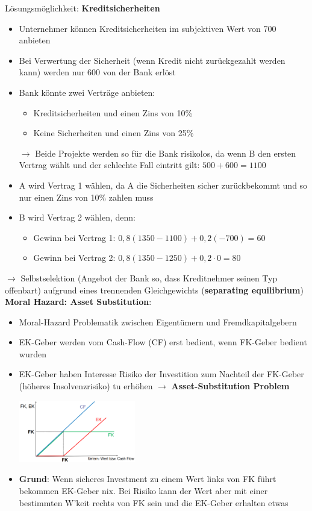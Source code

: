 Lösungsmöglichkeit: \textbf{Kreditsicherheiten}
\begin{itemize}
	\item Unternehmer können Kreditsicherheiten im subjektiven Wert von 700 anbieten
	\item Bei Verwertung der Sicherheit (wenn Kredit nicht zurückgezahlt werden kann) werden nur 600 von der Bank erlöst
	\item Bank könnte zwei Verträge anbieten:
	\begin{itemize}
		\item Kreditsicherheiten und einen Zins von 10\%
		\item Keine Sicherheiten und einen Zins von 25\%
	\end{itemize}
	$\rightarrow$ Beide Projekte werden so für die Bank risikolos, da wenn B den ersten Vertrag wählt und der schlechte Fall eintritt gilt: $500+600=1100$
	\item A wird Vertrag 1 wählen, da A die Sicherheiten sicher zurückbekommt und so nur einen Zins von 10\% zahlen muss
	\item B wird Vertrag 2 wählen, denn:
	\begin{itemize}
		\item Gewinn bei Vertrag 1: $0,8(1350-1100)+0,2(-700)=60$
		\item Gewinn bei Vertrag 2: $0,8(1350-1250)+0,2\cdot 0=80$
	\end{itemize}
\end{itemize}

$\rightarrow$ Selbstselektion (Angebot der Bank so, dass Kreditnehmer seinen Typ offenbart) aufgrund eines trennenden Gleichgewichts (\textbf{separating equilibrium})\\

\textbf{Moral Hazard: Asset Substitution}:
\begin{itemize}
	\item Moral-Hazard Problematik zwischen Eigentümern und Fremdkapitalgebern
	\item EK-Geber werden vom Cash-Flow (CF) erst bedient, wenn FK-Geber bedient wurden
	\item EK-Geber haben Interesse Risiko der Investition zum Nachteil der FK-Geber (höheres Insolvenzrisiko) tu erhöhen $\rightarrow$ \textbf{Asset-Substitution Problem}
	\begin{center}
		\includegraphics[width=0.4\textwidth]{images/mh.png}
	\end{center} 
	\item \textbf{Grund}: Wenn sicheres Investment zu einem Wert links von FK führt bekommen EK-Geber nix. Bei Risiko kann der Wert aber mit einer bestimmten W'keit rechts von FK sein und die EK-Geber erhalten etwas
\end{itemize}

